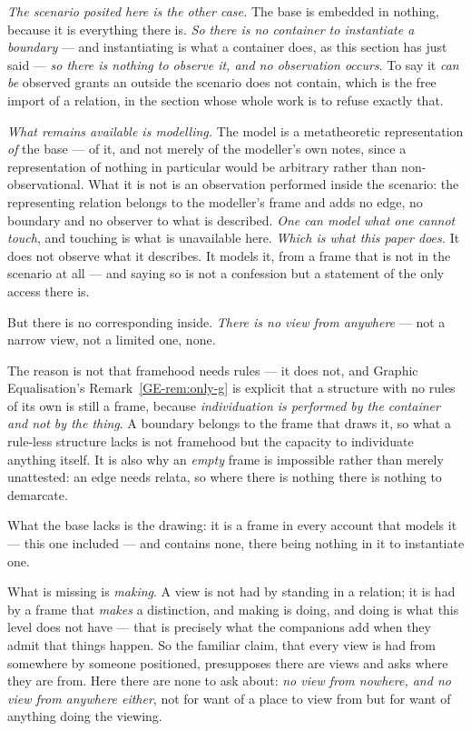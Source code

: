 \documentclass[11pt,a4paper]{article}
\theoremstyle{remark}\newtheorem{remark}[proposition]{Remark}
\begin{document}
\emph{The scenario posited here is the other case.} The base is embedded in nothing, because it is
everything there is. \emph{So there is no container to instantiate a boundary} --- and instantiating is
what a container does, as this section has just said --- \emph{so there is nothing to observe it, and no
observation occurs}. To say it \emph{can be} observed grants an outside the scenario does not contain,
which is the free import of a relation, in the section whose whole work is to refuse exactly that.

\emph{What remains available is modelling.} The model is a metatheoretic representation \emph{of} the base --- of
it, and not merely of the modeller's own notes, since a representation of nothing in particular would
be arbitrary rather than non-observational. What it is not is an observation performed inside the
scenario: the representing relation belongs to the modeller's frame and adds no edge, no boundary and
no observer to what is described. \emph{One can model what one cannot touch}, and touching is what is
unavailable here. \emph{Which is what this paper does.} It does not observe what it describes. It models
it, from a frame that is not in the scenario at all --- and saying so is not a confession but a
statement of the only access there is.

But there is no corresponding inside. \emph{There is no view from anywhere} --- not a narrow
view, not a limited one, none.

The reason is not that framehood needs rules --- it does not, and Graphic Equalisation's
Remark~\ref{GE-rem:only-g} is explicit that a structure with no rules of its own is still a frame,
because \emph{individuation is performed by the container and not by the thing}. A boundary belongs to the frame that draws it, so what a rule-less
structure lacks is not framehood but the capacity to individuate anything itself. It is also why an
\emph{empty} frame is impossible rather than merely unattested: an edge needs relata, so where there is
nothing there is nothing to demarcate.

What the base lacks is the drawing: it is a frame in every account that models it --- this one
included --- and contains none, there being nothing in it to instantiate one.

What is missing is \emph{making}. A view is not had by standing in a relation; it is had by a frame
that \emph{makes} a distinction, and making is doing, and doing is what this level does not have ---
that is precisely what the companions add when they admit that things happen. So the familiar claim,
that every view is had from somewhere by someone positioned, presupposes there are views and asks where
they are from. Here there are none to ask about: \emph{no view from nowhere, and no view from anywhere
either}, not for want of a place to view from but for want of anything doing the viewing.
\end{document}

